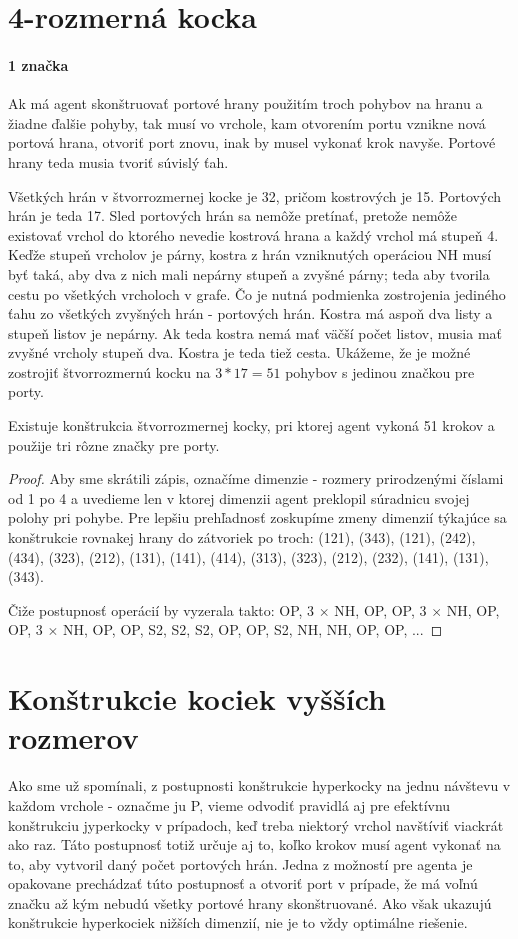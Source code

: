 \section{4-rozmerná kocka}
\paragraph{1 značka}
Ak má agent skonštruovať portové hrany použitím troch pohybov na hranu 
a žiadne
ďalšie pohyby, tak musí vo vrchole, kam otvorením portu vznikne nová
portová hrana, otvoriť port znovu, inak by musel vykonať krok navyše.
Portové hrany teda musia tvoriť súvislý ťah. 

Všetkých hrán v štvorrozmernej kocke je 32, pričom kostrových je 15.
Portových hrán je teda 17. Sled portových hrán sa nemôže pretínať, pretože
nemôže existovať vrchol do ktorého nevedie kostrová hrana a každý vrchol má
stupeň 4. Keďže stupeň vrcholov je párny, kostra z hrán vzniknutých
operáciou NH musí byť taká, aby
dva z nich mali nepárny stupeň a zvyšné párny; teda aby tvorila cestu po
všetkých vrcholoch v grafe. Čo je nutná podmienka zostrojenia
jediného ťahu zo všetkých zvyšných hrán - portových hrán. 
Kostra má aspoň dva listy a stupeň listov je nepárny. 
Ak teda kostra nemá mať väčší počet listov, musia mať
zvyšné vrcholy stupeň dva. Kostra je teda tiež cesta. Ukážeme, že je možné
zostrojiť štvorrozmernú kocku na $3 * 17 = 51$ pohybov s jedinou značkou pre
porty. 
\begin{veta}
Existuje konštrukcia štvorrozmernej kocky, pri ktorej agent vykoná 51 krokov
a použije tri rôzne značky pre porty.
\end{veta}
\begin{proof}
Aby sme skrátili zápis, označíme dimenzie - rozmery prirodzenými číslami od 1 po 4 a
uvedieme len v ktorej dimenzii agent preklopil súradnicu svojej polohy pri
pohybe. Pre lepšiu prehľadnosť zoskupíme zmeny dimenzií týkajúce sa konštrukcie
rovnakej hrany do zátvoriek po troch: (121), (343), (121), (242), (434),
(323), (212), (131), (141), (414), (313), (323), (212), (232), (141), (131),
(343).

Čiže postupnosť operácií by vyzerala takto: OP, 3 $\times$ NH, OP, OP, 3 $\times$
NH, OP, OP, 3 $\times$ NH, OP, OP, S2, S2, S2, OP, OP, S2, NH, NH, OP, OP,
...
\end{proof}

\section{Konštrukcie kociek vyšších rozmerov}
Ako sme už spomínali, z postupnosti konštrukcie hyperkocky na jednu návštevu
v každom vrchole - označme ju P, vieme odvodiť pravidlá aj pre efektívnu konštrukciu
jyperkocky v prípadoch, keď treba niektorý vrchol navštíviť viackrát ako
raz. Táto postupnosť totiž určuje aj to, koľko krokov musí agent vykonať na
to, aby vytvoril daný počet portových hrán. Jedna z možností pre agenta je
opakovane prechádzať túto postupnosť a otvoriť port v prípade, že má voľnú
značku až kým nebudú všetky portové hrany skonštruované. Ako však ukazujú
konštrukcie hyperkociek nižších dimenzií, nie  je to vždy optimálne
riešenie.


